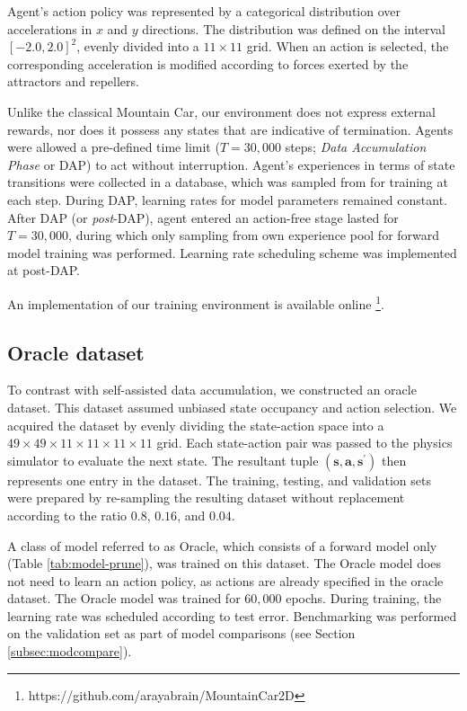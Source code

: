 \documentclass[utf8]{frontiersSCNS}
\newcommand{\bs}{\boldsymbol}
\begin{document}
Agent's action policy was represented by a categorical distribution over accelerations in $x$ and $y$ directions. The distribution was defined on the interval $[-2.0, 2.0]^2$, evenly divided into a $11\times 11$ grid. When an action is selected, the corresponding acceleration is modified according to forces exerted by the attractors and repellers.

Unlike the classical Mountain Car, our environment does not express external rewards, nor does it possess any states that are indicative of termination. Agents were allowed a pre-defined time limit ($T=30,000$ steps; {\it Data Accumulation Phase} or DAP) to act without interruption. Agent's experiences in terms of state transitions were collected in a database, which was sampled from for training at each step. During DAP, learning rates for model parameters remained constant. After DAP (or {\it post}-DAP), agent entered an action-free stage lasted for $T=30,000$, during which only sampling from own experience pool for forward model training was performed. Learning rate scheduling scheme was implemented at post-DAP.

An implementation of our training environment is available online \footnote{https://github.com/arayabrain/MountainCar2D}.

\subsection{Oracle dataset} \label{subsec:oracle}

To contrast with self-assisted data accumulation, we constructed an oracle dataset. This dataset assumed unbiased state occupancy and action selection. We acquired the dataset by evenly dividing the state-action space into a $49 \times 49 \times 11 \times 11 \times 11 \times 11$ grid. Each state-action pair was passed to the physics simulator to evaluate the next state. The resultant tuple $(\bs s, \bs a, \bs s^\prime)$ then represents one entry in the dataset. The training, testing, and validation sets were prepared by re-sampling the resulting dataset without replacement according to the ratio $0.8$, $0.16$, and $0.04$.

A class of model referred to as Oracle, which consists of a forward model only (Table \ref{tab:model-prune}), was trained on this dataset. The Oracle model does not need to learn an action policy, as actions are already specified in the oracle dataset. The Oracle model was trained for $60,000$ epochs. During training, the learning rate was scheduled according to test error. Benchmarking was performed on the validation set as part of model comparisons (see Section \ref{subsec:modcompare}).
\end{document}
